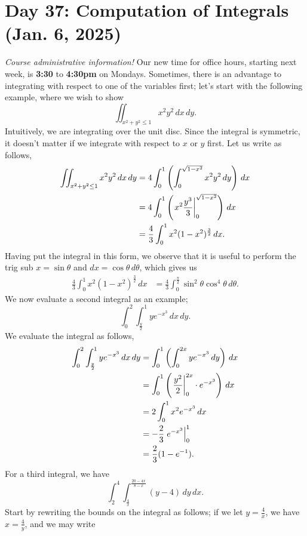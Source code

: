 \section{Day 37: Computation of Integrals (Jan. 6, 2025)}
\textit{Course administrative information!} Our new time for office hours, starting next week, is \textbf{3:30} to \textbf{4:30pm} on Mondays.
\medskip\newline
\noindent Sometimes, there is an advantage to integrating with respect to one of the variables first; let's start with the following example, where we wish to show
\[ \iint_{x^2 + y^2 \leq 1} x^2y^2 \, dx \, dy. \tag{1} \]
Intuitively, we are integrating over the unit disc. Since the integral is symmetric, it doesn't matter if we integrate with respect to $x$ or $y$ first. Let us write as follows,
\begin{align*}
    \iint_{x^2 + y^2 \leq 1} x^2y^2 \, dx \, dy &= 4 \int_0^1 \left( \int_0^{\sqrt{1 - x^2}} x^2y^2 \, dy \right) \, dx \\
    &= 4 \int_0^1 \left( \left.x^2 \frac{y^3}{3}\right\rvert_{0}^{\sqrt{1-x^2}} \right) \, dx \\
    &= \frac{4}{3} \int_0^1 x^2 (1 - x^2)^{\frac{3}{2}} \, dx.
\end{align*}
Having put the integral in this form, we observe that it is useful to perform the trig sub $x = \sin \theta$ and $dx = \cos \theta \, d \theta$, which gives us
\begin{align*}
    \frac{4}{3} \int_0^1 x^2 (1 - x^2)^{\frac{3}{2}} \, dx &= \frac{4}{3} \int_0^{\frac{\pi}{2}} \sin^2 \theta \cos^4 \theta \, d\theta.
\end{align*}
We now evaluate a second integral as an example;
\[ \int_0^2 \int_{\frac{y}{2}}^1 ye^{-x^3} \, dx \, dy. \tag{2} \]
We evaluate the integral as follows,
\begin{align*}
    \int_0^2 \int_{\frac{y}{2}}^1 ye^{-x^3} \, dx \, dy &= \int_0^1 \left(\int_0^{2x} ye^{-x^3} \, dy \right) \, dx \\
    &= \int_0^1 \left(\left.\frac{y^2}{2}\right\rvert_{0}^{2x} \cdot e^{-x^3} \right) \, dx \\
    &= 2 \int_0^1 x^2 e^{-x^3} \, dx \\
    &= -\frac{2}{3} \left.e^{-x^3}\right\rvert_{0}^{1} \\
    &= \frac{2}{3} (1-e^{-1}).
\end{align*}
For a third integral, we have
\[ \int_2^4 \int_{\frac{4}{x}}^{\frac{20 - 4x}{8 - x}} (y - 4) \, dy \, dx. \tag{3} \]
Start by rewriting the bounds on the integral as follows; if we let $y = \frac{4}{x}$, we have $x = \frac{4}{y}$, and we may write
